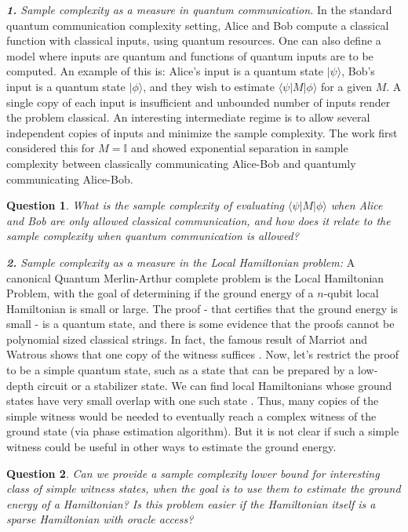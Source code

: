 \documentclass[11pt]{article}
\newcommand{\id}{\ensuremath{\mathbb{I}}}
\newcommand{\ket}[1]{|#1\rangle}
\newcommand{\bra}[1]{\langle#1|}
\newtheorem{question}{Question}
\begin{document}
\emph{\textbf{1.}  Sample complexity as a measure in quantum communication.} In the standard quantum communication complexity setting, Alice and Bob compute a classical function with classical inputs, using quantum resources. One can also define a model where inputs are quantum and functions of quantum inputs are to be computed. An example of this is: Alice's input is a quantum state $\ket{\psi}$, Bob's input is a quantum state $\ket{\phi}$, and they wish to estimate $\bra{\psi} M \ket{\phi}$ for a given $M$. A single copy of each input is insufficient and unbounded number of inputs render the problem classical. An interesting intermediate regime is to allow several independent copies of inputs and minimize the sample complexity. The work \cite{ALL22} first considered this for $M=\id$ and showed exponential separation in sample complexity between classically communicating Alice-Bob and quantumly communicating Alice-Bob.
\begin{question}
What is the sample complexity of evaluating $\bra{\psi} M \ket{\phi}$ when Alice and Bob are only allowed classical communication, and how does it relate to the sample complexity when quantum communication is allowed? 
\end{question}

\emph{\textbf{2.} Sample complexity as a measure in the Local Hamiltonian problem:} A canonical Quantum Merlin-Arthur complete problem is the Local Hamiltonian Problem, with the goal of determining if the ground energy of a $n$-qubit local Hamiltonian is small or large. The proof - that certifies that the ground energy is small - is a quantum state, and there is some evidence that the proofs cannot be polynomial sized classical strings. In fact, the famous result of Marriot and Watrous shows that one copy of the witness suffices \cite{MW05}. Now, let's restrict the proof to be a simple quantum state, such as a state that can be prepared by a low-depth circuit or a stabilizer state. We can find local Hamiltonians whose ground states have very small overlap with one such state \cite{AN22}. Thus, many copies of the simple witness would be needed to eventually reach a complex witness of the ground state (via phase estimation algorithm). But it is not clear if such a simple witness could be useful in other ways to estimate the ground energy.
\begin{question}
Can we provide a sample complexity lower bound for interesting class of simple witness states, when the goal is to use them to estimate the ground energy of a Hamiltonian? Is this problem easier if the Hamiltonian itself is a sparse Hamiltonian with oracle access?
\end{question}
\end{document}
